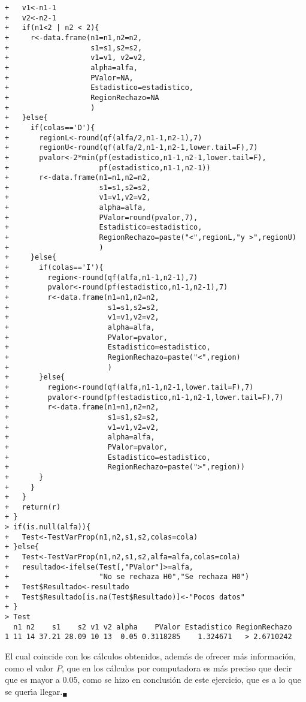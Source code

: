 \begin{solucion}
\begin{verbatim}
+   v1<-n1-1
+   v2<-n2-1
+   if(n1<2 | n2 < 2){
+     r<-data.frame(n1=n1,n2=n2,
+                   s1=s1,s2=s2,
+                   v1=v1, v2=v2,
+                   alpha=alfa,
+                   PValor=NA,
+                   Estadistico=estadistico,
+                   RegionRechazo=NA
+                   )
+   }else{
+     if(colas=='D'){
+       regionL<-round(qf(alfa/2,n1-1,n2-1),7)
+       regionU<-round(qf(alfa/2,n1-1,n2-1,lower.tail=F),7)
+       pvalor<-2*min(pf(estadistico,n1-1,n2-1,lower.tail=F),
+                     pf(estadistico,n1-1,n2-1))
+       r<-data.frame(n1=n1,n2=n2,
+                     s1=s1,s2=s2,
+                     v1=v1,v2=v2,
+                     alpha=alfa,
+                     PValor=round(pvalor,7),
+                     Estadistico=estadistico,
+                     RegionRechazo=paste("<",regionL,"y >",regionU)
+                     )
+     }else{
+       if(colas=='I'){
+         region<-round(qf(alfa,n1-1,n2-1),7)
+         pvalor<-round(pf(estadistico,n1-1,n2-1),7)
+         r<-data.frame(n1=n1,n2=n2,
+                       s1=s1,s2=s2,
+                       v1=v1,v2=v2,
+                       alpha=alfa,
+                       PValor=pvalor,
+                       Estadistico=estadistico,
+                       RegionRechazo=paste("<",region)
+                       )
+       }else{
+         region<-round(qf(alfa,n1-1,n2-1,lower.tail=F),7)
+         pvalor<-round(pf(estadistico,n1-1,n2-1,lower.tail=F),7)
+         r<-data.frame(n1=n1,n2=n2,
+                       s1=s1,s2=s2,
+                       v1=v1,v2=v2,
+                       alpha=alfa,
+                       PValor=pvalor,
+                       Estadistico=estadistico,
+                       RegionRechazo=paste(">",region))
+       }
+     }
+   }
+   return(r)
+ }
> if(is.null(alfa)){
+   Test<-TestVarProp(n1,n2,s1,s2,colas=cola)
+ }else{
+   Test<-TestVarProp(n1,n2,s1,s2,alfa=alfa,colas=cola)
+   resultado<-ifelse(Test[,"PValor"]>=alfa,
+                     "No se rechaza H0","Se rechaza H0")
+   Test$Resultado<-resultado
+   Test$Resultado[is.na(Test$Resultado)]<-"Pocos datos"
+ }
> Test
  n1 n2    s1    s2 v1 v2 alpha    PValor Estadistico RegionRechazo
1 11 14 37.21 28.09 10 13  0.05 0.3118285    1.324671   > 2.6710242
 \end{verbatim}
 \vspace{-0.7cm}
 El cual coincide con los c\'alculos obtenidos,
 adem\'as de ofrecer m\'as informaci\'on, como el valor $P$,
 que en los c\'alculos por computadora es m\'as preciso
 que decir que es mayor a $0.05$, como se hizo en conclusi\'on
 de este ejercicio, que es a lo que se quer\'{\i}a llegar.${}_{\blacksquare}$
\end{solucion}
